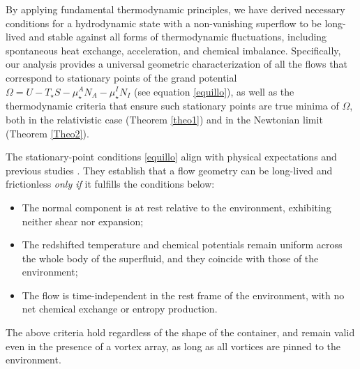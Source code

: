 \documentclass[a4paper, amsfonts, amssymb, amsmath, reprint, showkeys, nofootinbib, twoside,notitlepage,onecolumn]{revtex4-2}
\theoremstyle{definition}
\theoremstyle{theorem}
\theoremstyle{corollary}
\begin{document}
By applying fundamental thermodynamic principles, we have derived necessary conditions for a hydrodynamic state with a non-vanishing superflow to be long-lived and stable against all forms of thermodynamic fluctuations, including spontaneous heat exchange, acceleration, and chemical imbalance. Specifically, our analysis provides a universal geometric characterization of all the flows that correspond to stationary points of the grand potential $\Omega=U{-}T_\star S{-}\mu_\star^A N_A {-}
\mu_\star^I N_I$ (see equation \eqref{equillo}), as well as the thermodynamic criteria that ensure such stationary points are true minima of $\Omega$, both in the relativistic case (Theorem \ref{theo1}) and in the Newtonian limit (Theorem \ref{Theo2}). 

{\color{black}The stationary-point conditions \eqref{equillo} align with physical expectations and previous studies \cite{khalatnikov_book,Termo}. They establish that a flow geometry can be long-lived and frictionless \textit{only if} it fulfills the conditions below:
\begin{itemize}
\item The normal component is at rest relative to the environment, exhibiting neither shear nor expansion;
\item The redshifted temperature and chemical potentials remain uniform across the whole body of the superfluid, and they coincide with those of the environment;
\item The flow is time-independent in the rest frame of the environment, with no net chemical exchange or entropy production.
\end{itemize}
The above criteria hold regardless of the shape of the container, and remain valid even in the presence of a vortex array, as long as all vortices are pinned to the environment.

}
\end{document}
